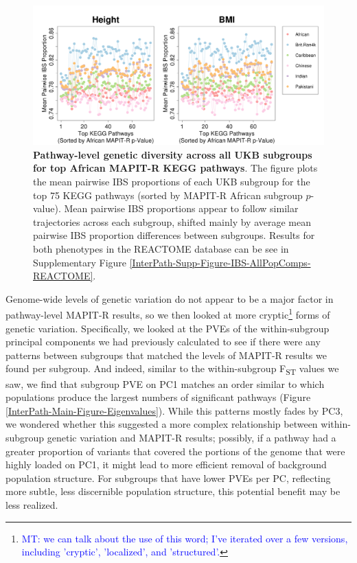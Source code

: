 \documentclass[12pt,a4paper]{article}
\begin{document}
\begin{figure}[htb]
\centering
\includegraphics[scale=.35]{Images/Main/InterPath_Main_Figure_IBS_AllPopComps_vs3_KEGG.png}
\caption[TBD]{\textbf{Pathway-level genetic diversity across all UKB subgroups for top African MAPIT-R KEGG pathways}. The figure plots the mean pairwise IBS proportions of each UKB subgroup for the top 75 KEGG pathways (sorted by MAPIT-R African subgroup $p$-value). Mean pairwise IBS proportions appear to follow similar trajectories across each subgroup, shifted mainly by average mean pairwise IBS proportion differences between subgroups. Results for both phenotypes in the REACTOME database can be see in Supplementary Figure \ref{InterPath-Supp-Figure-IBS-AllPopComps-REACTOME}.}
\label{InterPath-Main-Figure-IBS-AllPopComps-KEGG}
\end{figure}

Genome-wide levels of genetic variation do not appear to be a major factor in pathway-level MAPIT-R results, so we then looked at more cryptic\footnote{\textcolor{blue}{MT: we can talk about the use of this word; I've iterated over a few versions, including 'cryptic', 'localized', and 'structured'.}} forms of genetic variation. Specifically, we looked at the PVEs of the within-subgroup principal components we had previously calculated to see if there were any patterns between subgroups that matched the levels of MAPIT-R results we found per subgroup. And indeed, similar to the within-subgroup F\textsubscript{ST} values we saw, we find that subgroup PVE on PC1 matches an order similar to which populations produce the largest numbers of significant pathways (Figure \ref{InterPath-Main-Figure-Eigenvalues}). While this patterns mostly fades by PC3, we wondered whether this suggested a more complex relationship between within-subgroup genetic variation and MAPIT-R results; possibly, if a pathway had a greater proportion of variants that covered the portions of the genome that were highly loaded on PC1, it might lead to more efficient removal of background population structure. For subgroups that have lower PVEs per PC, reflecting more subtle, less discernible population structure, this potential benefit may be less realized.
\end{document}
